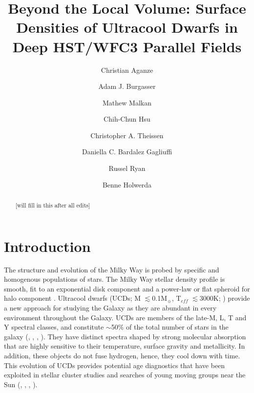\documentclass[manuscript]{aastex}
\begin{document}
\newcommand{\meth}{CH$_4$ }
\newcommand{\wat}{H$_2$O }
\newcommand{\teff}{T$_{eff}$ }
\newcommand{\Msun}{M$_\sun$}

\title{Beyond the Local Volume: Surface Densities of Ultracool Dwarfs in Deep HST/WFC3 Parallel Fields }

\author{Christian Aganze}
\author{Adam J. Burgasser }

\author{Mathew Malkan}

\author{Chih-Chun Hsu}

\author[0000-0002-9807-5435]{Christopher A. Theissen}

\author{Daniella C. Bardalez Gagliuffi}

\author{Russel Ryan}
\author{Benne Holwerda}


\begin{abstract}
[will fill in this after all edits]
\end{abstract}


\section{Introduction}

The structure and evolution of the Milky Way is probed by specific and homogenous populations of stars. The Milky Way stellar density profile is smooth, fit to an exponential disk component and a power-law or flat spheroid for halo component \citep{2008ApJ...673..864J}. Ultracool dwarfs (UCDs; M $\lesssim$0.1\Msun, {\teff} $\lesssim$3000K; \citealt{2005ARA&A..43..195K}) provide a new approach for studying the Galaxy as they are abundant in every environment throughout the Galaxy. UCDs are members of the late-M, L, T and Y spectral classes, and constitute $\sim$50\% of the total number of stars in the galaxy (\citealt{2007AJ....133..439C}, \citealt{2000ARA&A..38..337C}, \citealt{2001RvMP...73..719B},  \citealt{2010AJ....139.2679B}). They have distinct spectra shaped by strong molecular absorption that are highly sensitive to their temperature, surface gravity and metallicity. In addition, these objects do not fuse hydrogen, hence, they cool down with time. This evolution of UCDs provides potential age diagnostics that have been exploited in stellar cluster studies \citep{1998ASPC..134..394B,luhman2012,martin2017} and searches of young moving groups near the Sun (\citealt{LopezSantiago2006}, \citealt{Gagne2015}, \citealt{Mamajek2015}, \citealt{Faherty2018}). 
\end{document}
